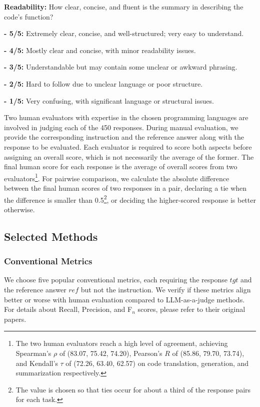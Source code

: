 \begin{tcolorbox}
\textbf{Readability:} How clear, concise, and fluent is the summary in describing the code’s function?

\textbf{- 5/5:} Extremely clear, concise, and well-structured; very easy to understand.

\textbf{- 4/5:} Mostly clear and concise, with minor readability issues.

\textbf{- 3/5:} Understandable but may contain some unclear or awkward phrasing.

\textbf{- 2/5:} Hard to follow due to unclear language or poor structure.

\textbf{- 1/5:} Very confusing, with significant language or structural issues.
\end{tcolorbox}

Two human evaluators with expertise in the chosen programming languages are involved in judging each of the 450 responses. During manual evaluation, we provide the corresponding instruction and the reference answer along with the response to be evaluated. Each evaluator is required to score both aspects before assigning an overall score, which is not necessarily the average of the former. The final human score for each response is the average of overall scores from two evaluators\footnote{The two human evaluators reach a high level of agreement, achieving Spearman's \(\rho\) of (83.07, 75.42, 74.20), Pearson's \(R\) of (85.86, 79.70, 73.74), and Kendall's \(\tau\) of (72.26, 63.40, 62.57) on code translation, generation, and summarization respectively.}. For pairwise comparison, we calculate the absolute difference between the final human scores of two responses in a pair, declaring a tie when the difference is smaller than 0.5\footnote{The value is chosen so that ties occur for about a third of the response pairs for each task.}, or deciding the higher-scored response is better otherwise. 

\subsection{Selected Methods}
\subsubsection{Conventional Metrics}
We choose five popular conventional metrics, each requiring the response \(tgt\) and the reference answer \(ref\) but not the instruction. We verify if these metrics align better or worse with human evaluation compared to LLM-as-a-judge methods.
For details about Recall, Precision, and F\(_n\) scores, please refer to their original papers.

